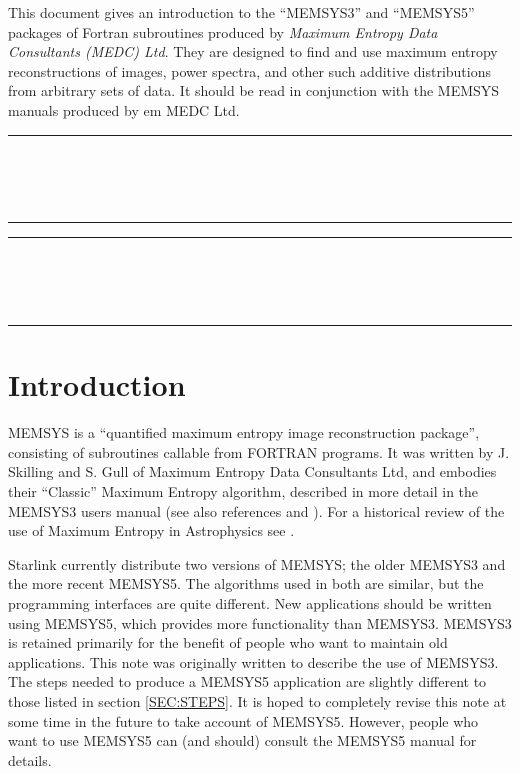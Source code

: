 This document gives an introduction to the ``MEMSYS3'' and ``MEMSYS5'' packages
of Fortran subroutines produced by {\em Maximum Entropy Data Consultants (MEDC)
Ltd}. They are designed to find and use maximum entropy reconstructions of
images, power spectra, and other such additive distributions from arbitrary sets
of data. It should be read in conjunction with the MEMSYS manuals produced by
{em MEDC Ltd}. 

\newpage
\markright{\stardocname}
\null\vspace {5mm}
\begin {center}
\rule{80mm}{0.5mm} \\ [1ex]
{\Large\bf \stardoctitle \\ [2.5ex]
           \stardocversion} \\ [2ex]
\rule{80mm}{0.5mm}
\end{center}

\setlength{\parskip}{0mm}
\tableofcontents
\setlength{\parskip}{\medskipamount}

\newpage
\markright{\stardocname}
\renewcommand{\thepage}{\arabic{page}}
\setcounter{page}{1}

\null\vspace {5mm}
\begin {center}
\rule{80mm}{0.5mm} \\ [1ex]
{\Large\bf \stardoctitle \\ [2.5ex]
           \stardocversion} \\ [2ex]
\rule{80mm}{0.5mm}
\end{center}
\vspace{30mm}

\section {Introduction}
MEMSYS is a ``quantified maximum entropy image reconstruction 
package'', consisting of subroutines callable from FORTRAN programs.
It was written by J. Skilling and S. Gull of Maximum Entropy Data 
Consultants Ltd, and embodies their ``Classic'' Maximum Entropy 
algorithm, described in more detail in the MEMSYS3 users manual (see
also references \cite{ref:Gull88} and \cite{ref:Skilling88}). For a historical 
review of the use of Maximum Entropy in Astrophysics see \cite{ref:Narayan}.

Starlink currently distribute two versions of MEMSYS; the older MEMSYS3 and the
more recent MEMSYS5. The algorithms used in both are similar, but the
programming interfaces are quite different. New applications should be written
using MEMSYS5, which provides more functionality than MEMSYS3. MEMSYS3 is
retained primarily for the benefit of people who want to maintain old
applications. This note was originally written to describe the use of MEMSYS3.
The steps needed to produce a MEMSYS5 application are slightly different to
those listed in section \ref {SEC:STEPS}. It is hoped to completely revise this
note at some time in the future to take account of MEMSYS5. However, people
who want to use MEMSYS5 can (and should) consult the MEMSYS5 manual for 
details. 

